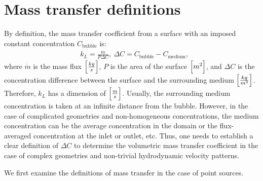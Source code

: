 \documentclass[review,12pt]{elsarticle}
\newcommand{\beqal}{\begin{equation}\begin{aligned}}
\newcommand{\feqal}{\end{aligned}\end{equation}}
\newcommand{\cbubble}{C_{\mathrm{bubble}}}
\newcommand{\cmedium}{C_{\mathrm{medium}}}
\begin{document}
\section{Mass transfer definitions}
\label{sec:mass:definitions}
By definition, the mass transfer coefficient from a surface with an imposed constant
concentration $\cbubble$ is:
\beqal
\label{eq:main:definition}
&k_L=\frac{\dot{m}}{P \Delta C},\ \Delta C= \cbubble - \cmedium,
\feqal
where $\dot{m}$ is the mass flux $\Bigl[\frac{kg}{s}\Bigr]$, $P$ is the area of the surface
$\Bigl[m^2\Bigr]$, and $\Delta C$ is the concentration difference between the surface and the surrounding medium
$\Bigl[\frac{kg}{m^3}\Bigr]$. Therefore, $k_L$ has a dimension of 
$\Bigl[\frac{m}{s}\Bigr]$. Usually, the surrounding medium concentration is taken at an infinite distance
from the bubble. However, in the case of complicated geometries and non-homogeneous concentrations, 
the medium concentration can be the average concentration in the domain or the flux-averaged
concentration at the inlet or outlet, etc. Thus, one needs to establish a clear definition of  $\Delta C$ to determine the volumetric
mass transfer coefficient in the case of complex geometries and non-trivial hydrodynamic velocity patterns.

We first examine the
 definitions of mass transfer in the case of point  sources.
\end{document}
